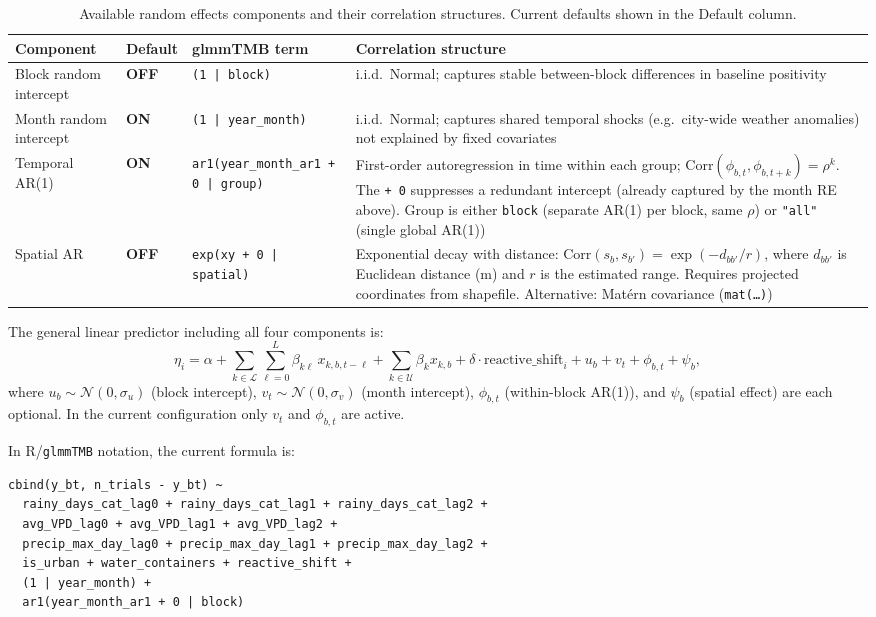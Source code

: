 \documentclass[12pt,a4paper]{article}
\begin{document}
\begin{table}[h]
\centering
\small
\begin{tabular}{p{3.5cm} p{2cm} p{3cm} p{5.5cm}}
\toprule
\textbf{Component} & \textbf{Default} & \textbf{glmmTMB term} & \textbf{Correlation structure} \\
\midrule
Block random intercept & \textbf{OFF} & \texttt{(1 | block)} & i.i.d.\ Normal; captures stable between-block differences in baseline positivity \\
\addlinespace
Month random intercept & \textbf{ON} & \texttt{(1 | year\_month)} & i.i.d.\ Normal; captures shared temporal shocks (e.g.\ city-wide weather anomalies) not explained by fixed covariates \\
\addlinespace
Temporal AR(1) & \textbf{ON} & \texttt{ar1(year\_month\_ar1 + 0 | group)} & First-order autoregression in time within each group; $\text{Corr}(\phi_{b,t},\phi_{b,t+k}) = \rho^k$. The \texttt{+ 0} suppresses a redundant intercept (already captured by the month RE above). Group is either \texttt{block} (separate AR(1) per block, same $\rho$) or \texttt{"all"} (single global AR(1)) \\
\addlinespace
Spatial AR & \textbf{OFF} & \texttt{exp(xy + 0 | spatial)} & Exponential decay with distance: $\text{Corr}(s_b, s_{b'}) = \exp(-d_{bb'}/r)$, where $d_{bb'}$ is Euclidean distance (m) and $r$ is the estimated range. Requires projected coordinates from shapefile. Alternative: Mat\'{e}rn covariance (\texttt{mat(\ldots)}) \\
\bottomrule
\end{tabular}
\caption{Available random effects components and their correlation structures. Current defaults shown in the Default column.}
\label{tab:re_options}
\end{table}

The general linear predictor including all four components is:
\begin{equation}
\eta_i = \alpha + \sum_{k \in \mathcal{L}} \sum_{\ell=0}^{L} \beta_{k\ell}\, x_{k,b,t-\ell} + \sum_{k \in \mathcal{U}} \beta_k x_{k,b} + \delta \cdot \text{reactive\_shift}_i + u_b + v_t + \phi_{b,t} + \psi_b,
\end{equation}
where $u_b \sim \mathcal{N}(0,\sigma_u)$ (block intercept), $v_t \sim \mathcal{N}(0,\sigma_v)$ (month intercept), $\phi_{b,t}$ (within-block AR(1)), and $\psi_b$ (spatial effect) are each optional.
In the current configuration only $v_t$ and $\phi_{b,t}$ are active.

In R/\texttt{glmmTMB} notation, the current formula is:
\begin{verbatim}
cbind(y_bt, n_trials - y_bt) ~
  rainy_days_cat_lag0 + rainy_days_cat_lag1 + rainy_days_cat_lag2 +
  avg_VPD_lag0 + avg_VPD_lag1 + avg_VPD_lag2 +
  precip_max_day_lag0 + precip_max_day_lag1 + precip_max_day_lag2 +
  is_urban + water_containers + reactive_shift +
  (1 | year_month) +
  ar1(year_month_ar1 + 0 | block)
\end{verbatim}
\end{document}
